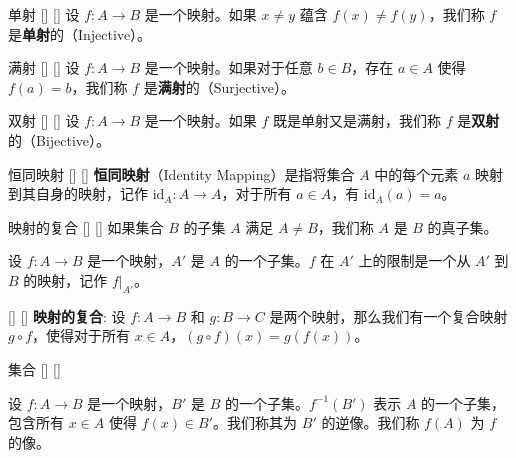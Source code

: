 \documentclass[UTF8]{ctexart}
\begin{document}
        \begin{dfn}
            []
            {单射}
            []
            []
            设 $f: A \to B$ 是一个映射。如果 $x \neq y$ 蕴含 $f(x) \neq f(y)$，我们称 $f$ 是\textbf{单射}的（Injective）。
        \end{dfn}

        \begin{dfn}
            []
            {满射}
            []
            []
            设 $f: A \to B$ 是一个映射。如果对于任意 $b \in B$，存在 $a \in A$ 使得 $f(a) = b$，我们称 $f$ 是\textbf{满射}的（Surjective）。
        \end{dfn}

        \begin{dfn}
            []
            {双射}
            []
            []
            设 $f: A \to B$ 是一个映射。如果 $f$ 既是单射又是满射，我们称 $f$ 是\textbf{双射}的（Bijective）。
        \end{dfn}

        \begin{dfn}
            []
            {恒同映射}
            []
            []
            \textbf{恒同映射}（Identity Mapping）是指将集合 $A$ 中的每个元素 $a$ 映射到其自身的映射，记作 $\text{id}_A: A \to A$，对于所有 $a \in A$，有 $\text{id}_A(a) = a$。
        \end{dfn}

        \begin{dfn}
            []
            {映射的复合}
            []
            []
            如果集合 $B$ 的子集 $A$ 满足 $A \neq B$，我们称 $A$ 是 $B$ 的真子集。

            设 $f: A \to B$ 是一个映射，$A'$ 是 $A$ 的一个子集。$f$ 在 $A'$ 上的限制是一个从 $A'$ 到 $B$ 的映射，记作 $f|_{A'}$。
        \end{dfn}

        \begin{dfn}
            []
            {}
            []
            []
			\textbf{映射的复合}: 设 $f: A \to B$ 和 $g: B \to C$ 是两个映射，那么我们有一个复合映射 $g \circ f$，使得对于所有 $x \in A$，$(g \circ f)(x) = g(f(x))$。
		\end{dfn}

		\begin{dfn}
            []
            {集合}
            []
            []

            设 $f: A \to B$ 是一个映射，$B'$ 是 $B$ 的一个子集。$f^{-1}(B')$ 表示 $A$ 的一个子集，包含所有 $x \in A$ 使得 $f(x) \in B'$。我们称其为 $B'$ 的逆像。我们称 $f(A)$ 为 $f$ 的像。
        \end{dfn}
\end{document}

